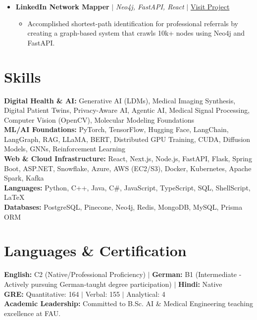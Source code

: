 \documentclass[10pt,a4paper]{article}
\newcommand{\resumeItem}[1]{\item\small{#1}}
\begin{document}
\begin{itemize}[label={}]
    \item \textbf{LinkedIn Network Mapper} $|$ \emph{Neo4j, FastAPI, React} $|$ \href{https://github.com/KartavyaDikshit/NetworkMapper}{Visit Project}
    \begin{itemize}
        \resumeItem{Accomplished shortest-path identification for professional referrals by creating a graph-based system that crawls 10k+ nodes using Neo4j and FastAPI.}
    \end{itemize}
\end{itemize}

\section{Skills}
\begin{itemize}[label={}]
    \small{\item{
     \textbf{Digital Health \& AI:}{ Generative AI (LDMs), Medical Imaging Synthesis, Digital Patient Twins, Privacy-Aware AI, Agentic AI, Medical Signal Processing, Computer Vision (OpenCV), Molecular Modeling Foundations} \\
     \textbf{ML/AI Foundations:}{ PyTorch, TensorFlow, Hugging Face, LangChain, LangGraph, RAG, LLaMA, BERT, Distributed GPU Training, CUDA, Diffusion Models, GNNs, Reinforcement Learning} \\
     \textbf{Web \& Cloud Infrastructure:}{ React, Next.js, Node.js, FastAPI, Flask, Spring Boot, ASP.NET, Snowflake, Azure, AWS (EC2/S3), Docker, Kubernetes, Apache Spark, Kafka} \\
     \textbf{Languages:}{ Python, C++, Java, C\#, JavaScript, TypeScript, SQL, ShellScript, LaTeX} \\
     \textbf{Databases:}{ PostgreSQL, Pinecone, Neo4j, Redis, MongoDB, MySQL, Prisma ORM}
    }}
\end{itemize}

\section{Languages \& Certification}
\begin{itemize}[label={}]
    \small{\item{
     \textbf{English:}{ C2 (Native/Professional Proficiency)} $|$ \textbf{German:}{ B1 (Intermediate - Actively pursuing German-taught degree participation)} $|$ \textbf{Hindi:}{ Native} \\
     \textbf{GRE:}{ Quantitative: 164 $|$ Verbal: 155 $|$ Analytical: 4} \\
     \textbf{Academic Leadership:}{ Committed to B.Sc. AI \& Medical Engineering teaching excellence at FAU.}
    }}
\end{itemize}
\end{document}
